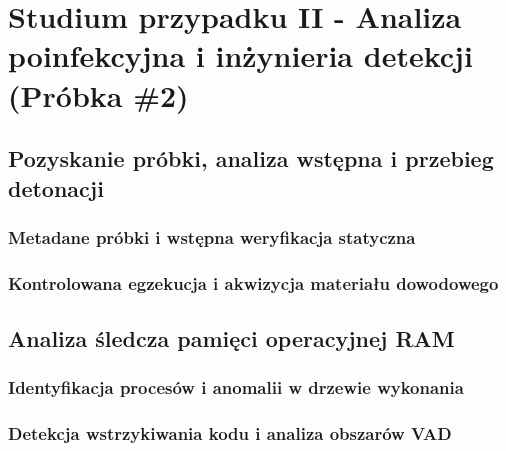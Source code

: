 \chapter{Studium przypadku II - Analiza poinfekcyjna i inżynieria detekcji (Próbka \#2)}\label{ch:studium_przypadku_2}

\section{Pozyskanie próbki, analiza wstępna i przebieg detonacji}\label{sec:cs2_triage}

\subsection{Metadane próbki i wstępna weryfikacja statyczna}\label{subsec:cs2_statyczna}

\subsection{Kontrolowana egzekucja i akwizycja materiału dowodowego}\label{subsec:cs2_egzekucja}

\section{Analiza śledcza pamięci operacyjnej RAM}\label{sec:cs2_analiza_ram}

\subsection{Identyfikacja procesów i anomalii w drzewie wykonania}\label{subsec:cs2_procesy_ram}

\subsection{Detekcja wstrzykiwania kodu i analiza obszarów VAD}\label{subsec:cs2_iniekcja_vad}

